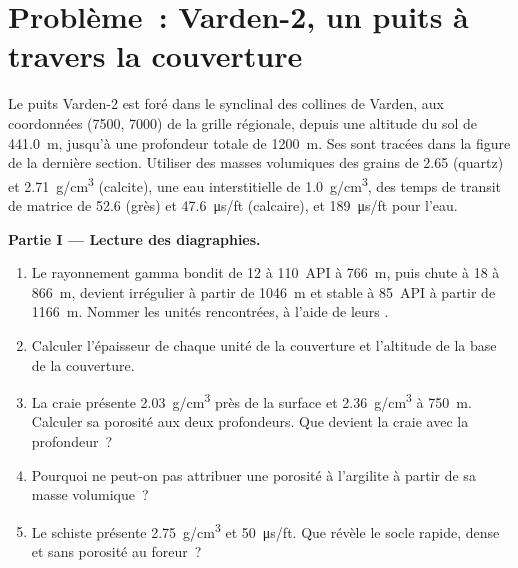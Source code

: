 \section{Problème~: Varden-2, un puits à travers la couverture}

\begin{problem}
\label{pb:b3:facies-models:1}
Le puits Varden-2 est foré dans le synclinal des collines de Varden, aux
coordonnées (7500, 7000) de la grille régionale, depuis une altitude du sol de
\qty{441.0}{m}, jusqu'à une profondeur totale de \qty{1200}{m}. Ses  sont tracées dans la
figure de la dernière section. Utiliser des masses volumiques des grains de 2.65 (quartz) et
\qty{2.71}{g/cm^3} (calcite), une eau interstitielle de \qty{1.0}{g/cm^3}, des temps de
transit de matrice de 52.6 (grès) et \qty{47.6}{\micro\second/ft}
(calcaire), et \qty{189}{\micro\second/ft} pour l'eau.

\medskip\noindent\textbf{Partie I --- Lecture des diagraphies.}
\begin{enumerate}
\item Le rayonnement gamma bondit de 12 à \qty{110}{API} à \qty{766}{m}, puis
  chute à 18 à \qty{866}{m}, devient irrégulier à partir de \qty{1046}{m} et stable à
  \qty{85}{API} à partir de \qty{1166}{m}. Nommer les unités rencontrées, à l'aide de leurs .
\item Calculer l'épaisseur de chaque unité de la couverture et l'altitude de
  la base de la couverture.
\item La craie présente \qty{2.03}{g/cm^3} près de la surface et
  \qty{2.36}{g/cm^3} à \qty{750}{m}. Calculer sa porosité aux deux profondeurs.
  Que devient la craie avec la profondeur~?
\item Pourquoi ne peut-on pas attribuer une porosité à l'argilite à partir de sa masse volumique~?
\item Le schiste présente \qty{2.75}{g/cm^3} et \qty{50}{\micro\second/ft}.
  Que révèle le socle rapide, dense et sans porosité au foreur~?
\end{enumerate}


\end{problem}

